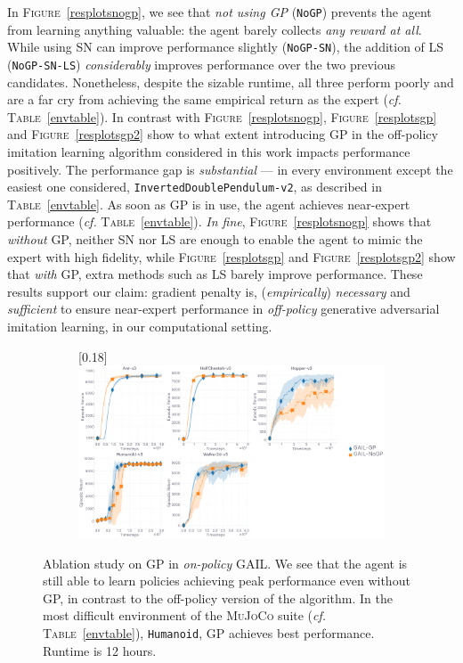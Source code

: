 In \textsc{Figure}~\ref{resplotsnogp}, we see that \emph{not using GP} (\texttt{NoGP})
prevents the agent
from learning anything valuable: the agent barely collects \emph{any reward at all}.
While using SN can improve performance slightly (\texttt{NoGP-SN}),
the addition of LS (\texttt{NoGP-SN-LS})
\emph{considerably} improves performance over the two previous candidates.
Nonetheless, despite the sizable runtime, all three perform poorly
and are a far cry from achieving the same empirical return as the expert
(\textit{cf.} \textsc{Table}~\ref{envtable}).
In contrast with \textsc{Figure}~\ref{resplotsnogp},
\textsc{Figure}~\ref{resplotsgp} and \textsc{Figure}~\ref{resplotsgp2}
show to what extent introducing GP in the off-policy imitation learning algorithm
considered in this work impacts performance positively.
The performance gap is \emph{substantial}
--- in every environment except the easiest one considered, \texttt{InvertedDoublePendulum-v2},
as described in \textsc{Table}~\ref{envtable}.
As soon as GP is in use, the agent achieves near-expert performance
(\textit{cf.} \textsc{Table}~\ref{envtable}).
\textit{In fine}, \textsc{Figure}~\ref{resplotsnogp} shows that
\emph{without} GP, neither SN nor LS are enough to enable the agent
to mimic the expert with high fidelity,
while \textsc{Figure}~\ref{resplotsgp}  and \textsc{Figure}~\ref{resplotsgp2}
show that \emph{with} GP,
extra methods such as LS barely improve performance.
These results support our claim: gradient penalty is, (\emph{empirically})
\emph{necessary} and \emph{sufficient} to ensure near-expert performance in
\emph{off-policy} generative adversarial imitation learning,
in our computational setting.

\begin{figure}
  \center
  \begin{subfigure}[t]{0.99\textwidth}
    \center\scalebox{0.18}[0.18]{\includegraphics{Plots/fig04_gail_sn_nols_5envs/plots_eval_env_ret_plot.pdf}}
  \end{subfigure}
  \caption{
  Ablation study on GP
  in \emph{on-policy} GAIL.
  We see that the agent is still able to learn policies achieving peak performance
  even without GP, in contrast to the off-policy version of the algorithm.
  In the most difficult environment of the \textsc{MuJoCo} suite
  (\textit{cf.} \textsc{Table}~\ref{envtable}),
  \texttt{Humanoid}, GP achieves best performance.
  Runtime is 12 hours.}
  \label{resplotsgail}
\end{figure}

